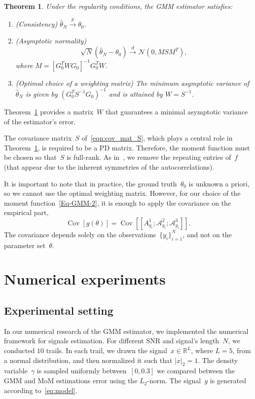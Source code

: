 \documentclass{article}
\newtheorem{theorem}[assumption]{Theorem}%
\newcommand{\A}[0]{\mathcal{A}}
\newcommand{\Cov}[0]{\operatorname{Cov}}
\newcommand{\R}[0]{\mathbb{R}}
\begin{document}
\begin{theorem}\label{Thm-2-6}
	Under {the} regularity conditions, the GMM estimator satisfies:
	\begin{enumerate}[label={\Alph*}.]
		\item  \label{Thm-2-2}
		\textnormal{(Consistency)} $\hat{\theta}_N \overset{p}{\to} \theta_0$.

		\item \label{Thm-2-3} \textnormal{(Asymptotic normality)}
		\[\sqrt{N} ( \hat{\theta}_N - \theta_0) \overset{d}{\to} \mathcal{N}(0, M S M^T ),\] where $M =[G_0^T W  G_0]^{-1} G_0^T  W$.

		\item \label{Thm-2-5} \textnormal{(Optimal choice of a weighting matrix)} The minimum asymptotic variance of $\hat{\theta}_N$ is given by $(G_0^T S^{-1} G_0)^{-1}$ and is attained by $W = S^{-1}$.
	\end{enumerate}
\end{theorem}
Theorem~\ref{Thm-2-6} provides a matrix~$W$ {that} guarantees a minimal asymptotic variance of the estimator’s error.

The covariance matrix~$S$ {of~\eqref{eqn:cov_mat_S}, which plays a central role in Theorem~\ref{Thm-2-6},} is required to be a PD matrix. Therefore, the moment function must be chosen so that~$S$ is full-rank. As in~\cite{abas2021generalized},  we remove the repeating entries of~$f$ (that appear due to the inherent symmetries of the autocorrelations).

It is important to note that in practice, the ground truth~$\theta_0$ is unknown a priori, so we cannot use the optimal weighting matrix. However, for our choice of the moment function~\eqref{Eq-GMM-2}, it is enough to apply the covariance on the empirical part,
	\begin{equation}\label{Eq-2-7}
		\Cov[g(\theta)] = \Cov\left[\left[A_{y_i}^1;\A_{y_i}^2;\A_{y_i}^3\right]\right].
	\end{equation}
	The covariance depends solely on the observations~$\{y_i\}_{i=1}^N$, and  not on  the parameter set~$\theta$.

\section{Numerical experiments}
\label{sec:numerical}

\subsection{Experimental setting}
In our numerical research of the GMM estimator, we implemented the numerical framework for signals estimation. For different SNR and signal's length~$N$, we conducted $10$ trails. In each trail, we drawn the signal~$x\in\R^L$, where $L=5$,  from a normal distribution, and then normalized it such that $\left|x\right|_2=1$. The density variable~$\gamma$ is sampled uniformly between~$\left[0,0.3\right]$ we compared between the GMM and MoM estimations error using the $L_2$-norm. The signal~$y$ is generated according to~\eqref{eq:model}.
\end{document}
